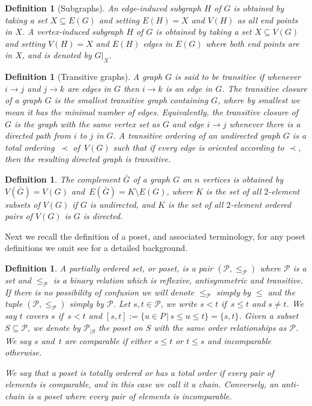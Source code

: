 \documentclass[9pt,a4paper,oneside]{article}
\newtheorem{definition}[theorem]{Definition}
\newcommand{\cP}{\mathcal{P}}
\begin{document}
\begin{definition}[Subgraphs]
 An \emph{edge-induced} subgraph $H$ of $G$ is obtained by taking a set $X\subseteq E(G)$ and setting $E(H)=X$ and $V(H)$ as all end points in $X$. 
 A \emph{vertex-induced} subgraph $H$ of $G$ is obtained by taking a set $X\subseteq V(G)$ and setting $V(H)=X$ and $E(H)$ edges in $E(G)$ where both end points are in $X$, and is denoted by $G|_X$. 
\end{definition}

\begin{definition}[Transitive graphs]
A graph $G$ is said to be \emph{transitive} if whenever $i\to j$ and $j \to k$ are edges in $G$ then $i\to k$ is an edge in $G$. 
The \emph{transitive closure} of a graph $G$ is the smallest transitive graph containing $G$, where by smallest we mean it has the minimal number of edges.  
Equivalently, the transitive closure of $G$ is the graph with the same vertex set as $G$ and edge $i \to j$ whenever there is a directed path from $i$ to $j$ in $G$.
A \emph{transitive ordering} of an undirected graph $G$ is a total ordering~$\prec$ of~$V(G)$ such that if every edge is oriented according to $\prec$, then the resulting directed graph is transitive.
\end{definition}


\begin{definition}
The \emph{complement} $\bar{G}$ of a graph $G$ on $n$ vertices is obtained by $V(\bar{G})=V(G)$ and~$E(\bar{G})=K\setminus E(G)$, where $K$ is the set of all $2$-element subsets of $V(G)$ if $G$ is undirected, and $K$ is the set of all $2$-element ordered pairs of $V(G)$ is $G$ is directed.
\end{definition}

Next we recall the definition of a poset, and associated terminology, for any poset definitions we omit see \cite[Chapter 3]{Sta11} for a detailed background.

\begin{definition}
A \emph{partially ordered set}, or \emph{poset}, is a pair $(\cP,\leq_\cP)$ where $\cP$ is a set and $\leq_\cP$ is a binary relation which is reflexive, antisymmetric and transitive.  If there is no possibility of confusion we will denote $\leq_\cP$ simply by $\leq$ and the tuple  $(\cP,\leq_\cP)$ simply by $\cP$.
Let $s,t \in \cP$,  we write $s<t$ if~$s\leq t$ and $s\neq t$.
We say $t$ \emph{covers} $s$ if~$s< t$ and $[s,t]:=\{u\in P\,|\, s\leq u \leq t\} =\{s,t\}$.  
Given a subset~$S\subseteq\mathcal{P}$, we denote by $\mathcal{P}_{|S}$ the poset on $S$ with the same order relationships as $\mathcal{P}$. 
We say $s$ and~$t$ are \emph{comparable} if either $s\leq t$ or $t\leq s$ and \emph{incomparable} otherwise.

We say that a poset is \emph{totally ordered} or \emph{has a total order} if every pair of elements is comparable, and in this case we call it a \emph{chain}.
Conversely, an \emph{anti-chain} is a poset where every pair of elements is incomparable. 
\end{definition}
\end{document}
